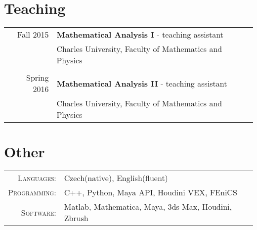 \documentclass[a4paper,10pt]{article} %
\begin{document}

\section{Teaching}

\begin{tabular}{rl}
  Fall 2015 & \textbf{Mathematical Analysis I} - teaching assistant \\
            & Charles University, Faculty of Mathematics and Physics \\
            & \\

  Spring 2016 & \textbf{Mathematical Analysis II} - teaching assistant \\
            & Charles University, Faculty of Mathematics and Physics \\
\end{tabular}


\section{Other}

\begin{tabular}{rl}
  \textsc{Languages}:   & Czech(native), English(fluent) \\
  \textsc{Programming}: & C++, Python, Maya API, Houdini VEX, FEniCS \\
  \textsc{Software}:    & Matlab, Mathematica, Maya, 3ds Max, Houdini, Zbrush
\end{tabular}

\end{document}
